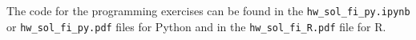 \documentclass[a4paper]{article}
\begin{document}

The code for the programming exercises can be found in the \texttt{hw\_sol\_fi\_py.ipynb} or \texttt{hw\_sol\_fi\_py.pdf} files for Python and in the \texttt{hw\_sol\_fi\_R.pdf} file for R.




%
\end{document}
